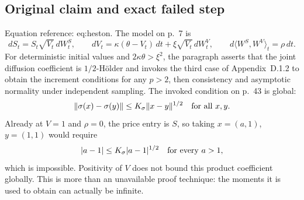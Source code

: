 \documentclass[10pt]{article}
\begin{document}
\subsection*{Original claim and exact failed step}
Equation reference: eq:heston. The model on p. 7 is \[
 dS_t=S_t\sqrt{V_t}\,dW^S_t,\qquad
 dV_t=\kappa(\theta-V_t)\,dt+\xi\sqrt{V_t}\,dW^V_t,
 \qquad d\langle W^S,W^V\rangle_t=\rho\,dt .\] For deterministic initial values and \(2\kappa\theta>\xi^2\), the paragraph asserts that the joint diffusion coefficient is \(1/2\)-Hölder and invokes the third case of Appendix D.1.2 to obtain the increment conditions for any \(p>2\), then consistency and asymptotic normality under independent sampling. The invoked condition on p. 43 is global: \[\|\sigma(x)-\sigma(y)\|\le K_\sigma\|x-y\|^{1/2}
 \quad\hbox{for all }x,y.\] Already at \(V=1\) and \(\rho=0\), the price entry is \(S\), so taking \(x=(a,1)\), \(y=(1,1)\) would require \[|a-1|\le K_\sigma |a-1|^{1/2}\quad\hbox{for every }a>1,\] which is impossible. Positivity of \(V\) does not bound this product coefficient globally. This is more than an unavailable proof technique: the moments it is used to obtain can actually be infinite.\par
\end{document}
